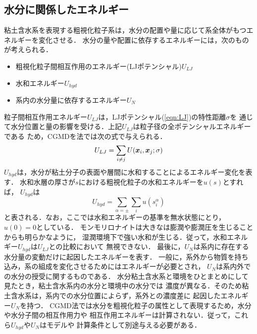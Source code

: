 \subsection{水分に関係したエネルギー}
粘土含水系を表現する粗視化粒子系は，水分の配置や量に応じて系全体がもつエネルギーを変化させる．
水分の量や配置に依存するエネルギーには，次のものが考えられる．
\begin{itemize}
\item
	粗視化粒子間相互作用のエネルギー(LJポテンシャル)$U_{LJ}$
\item
	水和エネルギー$U_{hyd}$
\item
	系内の水分量に依存するエネルギー$U_N$
\end{itemize}
粒子間相互作用エネルギー$U_{LJ}$は，LJポテンシャル(\ref{eqn:LJ})の特性距離$\sigma$を
通じて水分位置と量の影響を受ける．上記$U_{LJ}$は粒子径の全ポテンシャルエネルギーである
ため，CGMDを法では次の式で与えられる．
\begin{equation}
	U_{LJ}=\sum_{i \neq j} U(\mbox{\boldmath $x$}_i,\mbox{\boldmath $x$}_j; \sigma) 
	\label{eqn:}
\end{equation}
$U_{hyd}$は，水分が粘土分子の表面や層間に水和することによるエネルギー変化を表す．
水和水層の厚さが$s$における粗視化粒子の水和エネルギーを$u(s)$とすれば，
$U_{hyd}$は
\begin{equation}
	U_{hyd} =\sum_{\alpha=\pm} \sum_{i} u(s_i^{\alpha})
	\label{eqn:Uhyd_tot}
\end{equation}
と表される．なお，ここでは水和エネルギーの基準を無水状態にとり，$u(0)=0$としている．
モンモリロナイトは大きなは膨潤や膨潤圧を生じることからも明らかなように，
湿潤環境下で強い水和が生じる．従って，水和エネルギー$U_{hyd}$は$U_{LJ}$との比較において
無視できない．
最後に，$U_{N}$は系内に存在する水分量の変動だけに起因したエネルギーを表す．
一般に，系外から物質を持ち込み，系の組成を変化させるためにはエネルギーが必要とされ，
$U_N$は系内外での水分の授受に関するものである．
水分粘土含水系と環境をひとまとめにして見たとき，粘土含水系内の水分と環境中の水分では
濃度が異なる．そのため粘土含水系は，系内での水分位置によらず，系外との濃度差に
起因したエネルギー$U_N$を持つ．
CGMD法では水分を粗視化粒子の属性として表現するため，水分や水分子間の相互作用力や
相互作用エネルギーは計算されない．従って，これら$U_{hyd}$や$U_{N}$はモデルや
計算条件として別途与える必要がある．

